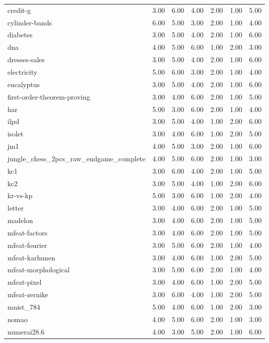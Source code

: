 \begin{table}[htbp]
\begin{tabular}{lrrrrrr}
credit-g & 3.00 & 6.00 & 4.00 & 2.00 & 1.00 & 5.00 \\
cylinder-bands & 6.00 & 5.00 & 3.00 & 2.00 & 1.00 & 4.00 \\
diabetes & 3.00 & 5.00 & 4.00 & 2.00 & 1.00 & 6.00 \\
dna & 4.00 & 5.00 & 6.00 & 1.00 & 2.00 & 3.00 \\
dresses-sales & 3.00 & 5.00 & 4.00 & 2.00 & 1.00 & 6.00 \\
electricity & 5.00 & 6.00 & 3.00 & 2.00 & 1.00 & 4.00 \\
eucalyptus & 3.00 & 5.00 & 4.00 & 2.00 & 1.00 & 6.00 \\
first-order-theorem-proving & 3.00 & 4.00 & 6.00 & 2.00 & 1.00 & 5.00 \\
har & 5.00 & 3.00 & 6.00 & 2.00 & 1.00 & 4.00 \\
ilpd & 3.00 & 5.00 & 4.00 & 1.00 & 2.00 & 6.00 \\
isolet & 3.00 & 4.00 & 6.00 & 1.00 & 2.00 & 5.00 \\
jm1 & 4.00 & 5.00 & 3.00 & 2.00 & 1.00 & 6.00 \\
jungle\_chess\_2pcs\_raw\_endgame\_complete & 4.00 & 5.00 & 6.00 & 2.00 & 1.00 & 3.00 \\
kc1 & 3.00 & 6.00 & 4.00 & 2.00 & 1.00 & 5.00 \\
kc2 & 3.00 & 5.00 & 4.00 & 1.00 & 2.00 & 6.00 \\
kr-vs-kp & 5.00 & 3.00 & 6.00 & 1.00 & 2.00 & 4.00 \\
letter & 3.00 & 4.00 & 6.00 & 2.00 & 1.00 & 5.00 \\
madelon & 3.00 & 4.00 & 6.00 & 2.00 & 1.00 & 5.00 \\
mfeat-factors & 3.00 & 4.00 & 6.00 & 2.00 & 1.00 & 5.00 \\
mfeat-fourier & 3.00 & 5.00 & 6.00 & 2.00 & 1.00 & 4.00 \\
mfeat-karhunen & 3.00 & 4.00 & 6.00 & 1.00 & 2.00 & 5.00 \\
mfeat-morphological & 3.00 & 5.00 & 6.00 & 2.00 & 1.00 & 4.00 \\
mfeat-pixel & 3.00 & 4.00 & 6.00 & 1.00 & 2.00 & 5.00 \\
mfeat-zernike & 3.00 & 6.00 & 4.00 & 1.00 & 2.00 & 5.00 \\
mnist\_784 & 5.00 & 4.00 & 6.00 & 1.00 & 2.00 & 3.00 \\
nomao & 4.00 & 5.00 & 6.00 & 2.00 & 1.00 & 3.00 \\
numerai28.6 & 4.00 & 3.00 & 5.00 & 2.00 & 1.00 & 6.00 \\

\end{tabular}
\end{table}
